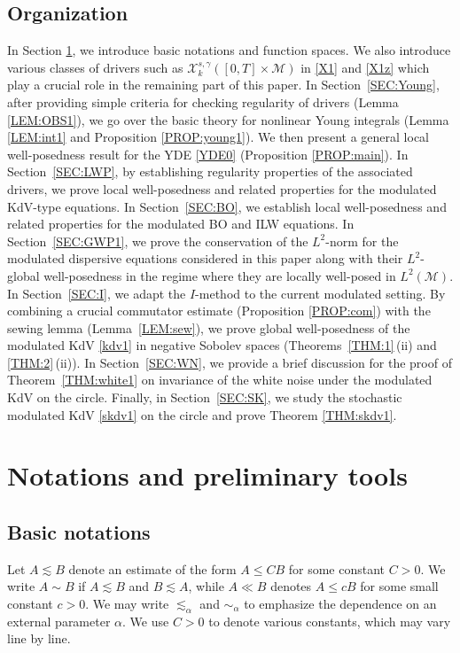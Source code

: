 \documentclass[letterpaper, 11pt,  reqno]{amsart}
\newcommand{\1}{\hspace{0.5mm}\text{I}\hspace{0.5mm}}
\newcommand{\al}{\alpha}
\newcommand{\g}{\gamma}
\newcommand{\les}{\lesssim}
\newcommand{\M}{\mathcal{M}}
\newcommand{\cX}{\mathcal{X}}
\numberwithin{equation}{section}
\numberwithin{theorem}{section}
\begin{document}
\subsection{Organization}

In Section
\ref{SEC:2}, 
we introduce basic notations and function spaces.
We also introduce various classes of drivers
such as $\cX^{s, \g}_k ([0, T]\times \M)$ in \eqref{X1}
and \eqref{X1z}
which play a crucial role in the remaining part of this paper.
In Section~\ref{SEC:Young}, 
after providing simple criteria
for checking regularity of drivers (Lemma \ref{LEM:OBS1}), 
we go over the basic theory
for nonlinear Young integrals
(Lemma \ref{LEM:int1} and Proposition \ref{PROP:young1}).
We then present a general local well-posedness
result for the YDE \eqref{YDE0}
(Proposition \ref{PROP:main}).
In Section~\ref{SEC:LWP}, 
by establishing regularity properties
of the associated drivers, 
we prove local well-posedness and related properties
for the modulated KdV-type equations.
In Section~\ref{SEC:BO}, 
we establish local well-posedness and related properties
for the modulated BO and ILW  equations.
In Section~\ref{SEC:GWP1}, 
we prove the conservation of the $L^2$-norm
for the modulated dispersive equations considered in this paper
along with their $L^2$-global well-posedness
in the regime where they are locally well-posed in $L^2(\M)$.
In Section~\ref{SEC:I}, we adapt the $I$-method
to the current modulated setting.
By combining a crucial  commutator estimate
(Proposition \ref{PROP:com})
with the sewing lemma (Lemma~\ref{LEM:sew}), 
we prove global well-posedness of the modulated
KdV \eqref{kdv1} in negative Sobolev spaces
(Theorems~\ref{THM:1}\,(ii) and \ref{THM:2}\,(ii)).
In Section~\ref{SEC:WN}, we provide a brief discussion 
for
the proof of Theorem~\ref{THM:white1}
on invariance of the white noise under the modulated KdV on the circle.
Finally, 
in Section~\ref{SEC:SK}, 
we study the stochastic modulated KdV
\eqref{skdv1} on the circle and prove Theorem \ref{THM:skdv1}.





\section{Notations and preliminary tools}
\label{SEC:2}

\subsection{Basic notations}
Let $A\les B$ denote an estimate of the form $A\leq CB$ for some constant $C>0$. We write $A\sim B$ if $A\les B$ and $B\les A$, while $A\ll B$ denotes $A\leq c B$ for some small constant $c> 0$. 
We may write  $\les_{\al}$ and $\sim_{\al}$ to 
emphasize the dependence on an external parameter $\al$.
We use $C>0$ to denote various constants, which may vary line by line.
\end{document}
